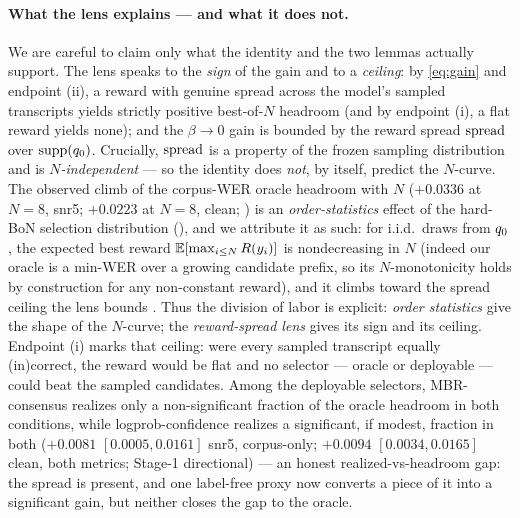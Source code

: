 \paragraph{What the lens explains --- and what it does not.}
We are careful to claim only what the identity and the two lemmas actually support. The lens speaks to
the \emph{sign} of the gain and to a \emph{ceiling}: by \eqref{eq:gain} and endpoint (ii), a reward with
genuine spread across the model's sampled transcripts yields strictly positive best-of-$N$ headroom (and
by endpoint (i), a flat reward yields none); and the $\beta\to0$ gain is bounded by the reward spread
$\mathrm{spread}$ over $\operatorname{supp}(q_{0})$. Crucially, $\mathrm{spread}$ is a property of the frozen sampling
distribution and is \emph{$N$-independent} --- so the identity does \emph{not}, by itself, predict the
$N$-curve. The observed climb of the corpus-WER oracle headroom with $N$ ($+0.0336$ at $N{=}8$, snr5;
$+0.0223$ at $N{=}8$, clean; ) is an \emph{order-statistics} effect of the hard-BoN
selection distribution (), and
we attribute it as such: for i.i.d.\ draws from $q_{0}$, the expected best reward $\mathbb{E}[\max_{i\le N}R(y_i)]$
is nondecreasing in $N$ (indeed our oracle is a min-WER over a growing candidate prefix, so its
$N$-monotonicity holds by construction for any non-constant reward), and it climbs toward the spread
ceiling the lens bounds \citep{beirami2024bon,verdun2025softbon}. Thus the division of labor is explicit:
\emph{order statistics} give the shape of the $N$-curve; the \emph{reward-spread lens} gives its sign and
its ceiling. Endpoint (i) marks that ceiling: were every sampled transcript equally (in)correct, the reward
would be flat and no selector --- oracle or deployable --- could beat the sampled candidates. Among the
deployable selectors, MBR-consensus realizes only a non-significant fraction of the oracle headroom in
both conditions, while logprob-confidence realizes a significant, if modest, fraction in both
($+0.0081$ $[0.0005,0.0161]$ snr5, corpus-only; $+0.0094$ $[0.0034,0.0165]$ clean, both metrics; Stage-1
directional) --- an honest realized-vs-headroom gap: the spread is present, and one label-free proxy now
converts a piece of it into a significant gain, but neither closes the gap to the oracle.

